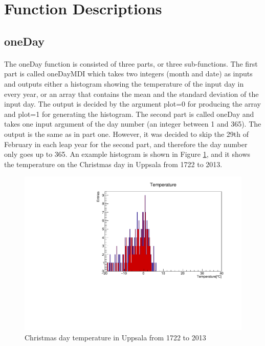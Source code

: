 \documentclass[a4paper,12pt]{article}
\begin{document}
\section{Function Descriptions}


\subsection{oneDay}
\paragraph{}
The oneDay function is consisted of three parts, or three sub-functions. The first part is called oneDayMDI which takes two integers (month and date) as inputs and outputs either a histogram showing the temperature of the input day in every year, or an array that contains the mean and the standard deviation of the input day. The output is decided by the argument plot=0 for producing the array and plot=1 for generating the histogram. The second part is called oneDay and takes one input argument of the day number (an integer between 1 and 365). The output is the same as in part one. However, it was decided to skip the 29th of February in each leap year for the second part, and therefore the day number only goes up to 365. An example histogram is shown in Figure \ref{fig:oneDayMDI_uppsala}, and it shows the temperature on the Christmas day in Uppsala from 1722 to 2013. 
\begin{figure}[h!]
    \centering
    \includegraphics[scale = 0.8]{oneDayMDI_uppsala.pdf}
    \caption{Christmas day temperature in Uppsala from 1722 to 2013}
    \label{fig:oneDayMDI_uppsala}
\end{figure}
\end{document}
